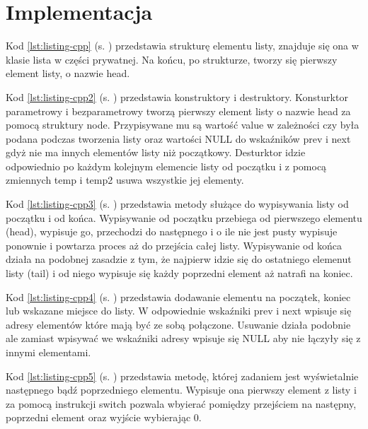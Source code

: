	\newpage
\section{Implementacja}		%



Kod \ref{lst:listing-cpp} (s. \pageref{lst:listing-cpp}) przedstawia strukturę elementu listy, znajduje się ona w klasie lista w części prywatnej. Na końcu, po strukturze, tworzy się pierwszy element listy, o nazwie head.



Kod \ref{lst:listing-cpp2} (s. \pageref{lst:listing-cpp2}) przedstawia konstruktory i destruktory. Konsturktor parametrowy i bezparametrowy tworzą pierwszy element listy o nazwie head za pomocą struktury node. Przypisywane mu są wartość value w zależności czy była podana podczas tworzenia listy oraz wartości NULL do wskaźników prev i next gdyż nie ma innych elementów listy niż początkowy. Desturktor idzie odpowiednio po każdym kolejnym elemencie listy od początku i z pomocą zmiennych temp i temp2 usuwa wszystkie jej elementy.



Kod \ref{lst:listing-cpp3} (s. \pageref{lst:listing-cpp3}) przedstawia metody służące do wypisywania listy od początku i od końca. Wypisywanie od początku przebiega od pierwszego elementu (head), wypisuje go, przechodzi do następnego i o ile nie jest pusty wypisuje ponownie i powtarza proces aż do przejścia całej listy. Wypisywanie od końca działa na podobnej zasadzie z tym, że najpierw idzie się do ostatniego elemenut listy (tail) i od niego wypisuje się każdy poprzedni element aż natrafi na koniec.



Kod \ref{lst:listing-cpp4} (s. \pageref{lst:listing-cpp4}) przedstawia dodawanie elementu na początek, koniec lub wskazane miejsce do listy. W odpowiednie wskaźniki prev i next wpisuje się adresy elementów które mają być ze sobą połączone. Usuwanie działa podobnie ale zamiast wpisywać we wskaźniki adresy wpisuje się NULL aby nie łączyły się z innymi elementami.



Kod \ref{lst:listing-cpp5} (s. \pageref{lst:listing-cpp5}) przedstawia metodę, której zadaniem jest wyświetalnie następnego bądź poprzedniego elementu. Wypisuje ona pierwszy element z listy i za pomocą instrukcji switch pozwala wbyierać pomiędzy przejściem na następny, poprzedni element oraz wyjście wybierając 0.